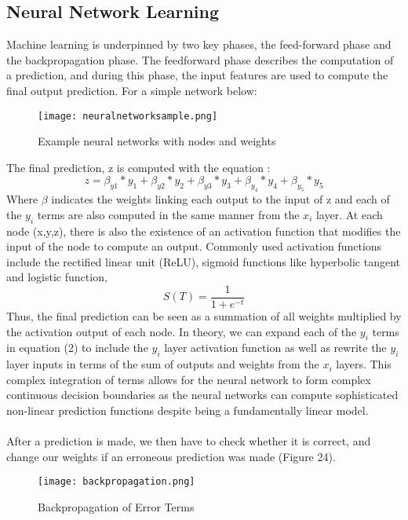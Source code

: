 \documentclass{article}
\begin{document}
\subsection{Neural Network Learning}
Machine learning is underpinned by two key phases, the feed-forward phase and the backpropagation phase. The feedforward phase describes the computation of a prediction, and during this phase, the input features are used to compute the final output prediction. For a simple network below:

\begin{figure}[H]
\texttt{[image: neuralnetworksample.png]}
\caption{Example neural networks with nodes and weights}
\centering
\end{figure}

The final prediction, z is computed with the equation :
\begin{equation}
z = \beta_{y1} * y_1 + \beta_{y2} * y_2 + \beta_{y3} * y_3 + \beta_{y_4} * y_4 + \beta_{y_5} * y_5
\end{equation}
Where $\beta$ indicates the weights linking each output to the input of z and each of the $y_i$ terms are also computed in the same manner from the $x_i$ layer. At each node (x,y,z), there is also the existence of an activation function that modifies the input of the node to compute an output. Commonly used activation functions include the rectified linear unit (ReLU), sigmoid functions like hyperbolic tangent and logistic function, 
\begin{equation}
S(T)=\frac{1}{1+e^{-t}}
\end{equation}
Thus, the final prediction can be seen as a summation of all weights multiplied by the activation output of each node. In theory, we can expand each of the $y_i$ terms in equation (2) to include the $y_i$ layer activation function as well as rewrite the $y_i$ layer inputs in terms of the sum of outputs and weights from the $x_i$ layers. This complex integration of terms allows for the neural network to form complex continuous decision boundaries as the neural networks can compute sophisticated non-linear prediction functions despite being a fundamentally linear model.\\\\ After a prediction is made, we then have to check whether it is correct, and change our weights if an erroneous prediction was made (Figure 24).
\begin{figure}[H]
\centering
\texttt{[image: backpropagation.png]}
\caption{Backpropagation of Error Terms}
\end{figure}
\end{document}
